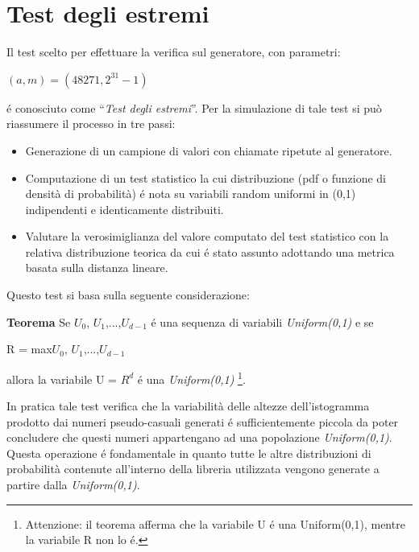 \section{Test degli estremi}
Il test scelto per effettuare la verifica sul generatore, con parametri:
\begin{center}
$(a,m) = (48271, 2^{31} - 1)$
\end{center}

\noindent \'e conosciuto come ``\textit{Test degli estremi}''. 
Per la simulazione di tale test si pu\`o riassumere il processo in tre passi:
\begin{itemize}
 \item Generazione di un campione di valori con chiamate ripetute al generatore.
 \item Computazione di un test statistico la cui distribuzione (pdf o funzione 
di densit\`a di probabilit\`a) \'e nota su variabili random uniformi in (0,1) indipendenti e identicamente 
distribuiti.
 \item Valutare la verosimiglianza del valore computato del test statistico con 
la relativa distribuzione
 teorica da cui \'e stato assunto adottando una metrica basata sulla distanza 
lineare.
\end{itemize}

Questo test si basa sulla seguente considerazione:

\vspace{0.5cm} \noindent \textbf{Teorema} Se $U_{0}^{}$, 
$U_{1}^{}$,...,$U_{d-1}^{}$ \'e una sequenza di variabili \textit{Uniform(0,1)} e 
se 

\begin{center}R = max{$U_{0}^{}$, $U_{1}^{}$,...,$U_{d-1}^{}$} \end{center} 

\noindent allora la variabile U = $R_{}^{d}$ \'e una \textit{Uniform(0,1)} 
\footnote{Attenzione: il teorema afferma che la variabile U \'e una Uniform(0,1), 
mentre la variabile R non lo \'e.}.

In pratica tale test verifica che la variabilit\`a delle altezze dell'istogramma 
prodotto dai numeri pseudo-casuali generati \'e sufficientemente piccola da poter 
concludere che questi numeri appartengano ad una popolazione 
\textit{Uniform(0,1)}. Questa operazione \'e fondamentale in quanto tutte le 
altre distribuzioni di probabilit\`a contenute all'interno della libreria 
utilizzata vengono generate a partire dalla \textit{Uniform(0,1)}.

